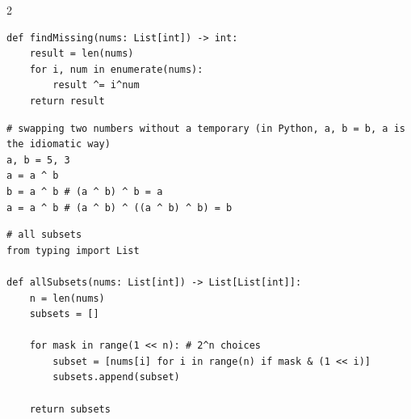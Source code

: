 \documentclass[9pt,a4paper]{extarticle}
\newlength{\tw}
\begin{document}
\begin{multicols}{2}
\begin{lstlisting}
def findMissing(nums: List[int]) -> int:
    result = len(nums)
    for i, num in enumerate(nums):
        result ^= i^num
    return result
\end{lstlisting}

\begin{lstlisting}
# swapping two numbers without a temporary (in Python, a, b = b, a is the idiomatic way)
a, b = 5, 3
a = a ^ b
b = a ^ b # (a ^ b) ^ b = a
a = a ^ b # (a ^ b) ^ ((a ^ b) ^ b) = b
\end{lstlisting}

\begin{lstlisting}
# all subsets
from typing import List

def allSubsets(nums: List[int]) -> List[List[int]]:
    n = len(nums)
    subsets = []

    for mask in range(1 << n): # 2^n choices
        subset = [nums[i] for i in range(n) if mask & (1 << i)]
        subsets.append(subset)

    return subsets
\end{lstlisting}
\end{multicols}
\end{document}
